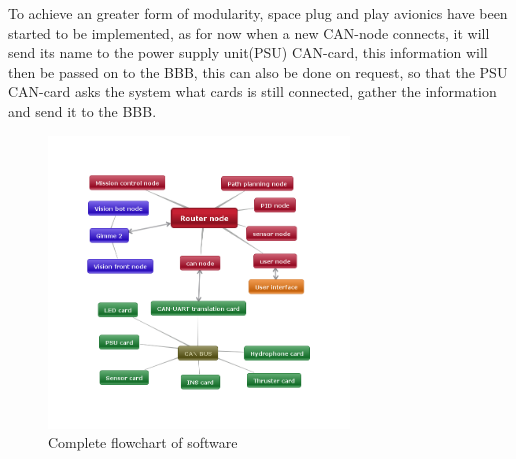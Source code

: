 To achieve an greater form of modularity, space plug and play avionics\cite{spnp} have been started to be implemented, as for now when a new CAN-node connects, it will send its name to the power supply unit(PSU) CAN-card, this information will then be passed on to the BBB, this can also be done on request, so that the PSU CAN-card asks the system what cards is still connected, gather the information and send it to the BBB.


\begin{figure}[!ht]
	\begin{center}
		\includegraphics[width=80mm]{./Images/Software/flowchart.png}
		\caption{Complete flowchart of software}
		\label{YourLabel}
	\end{center}
\end{figure}
